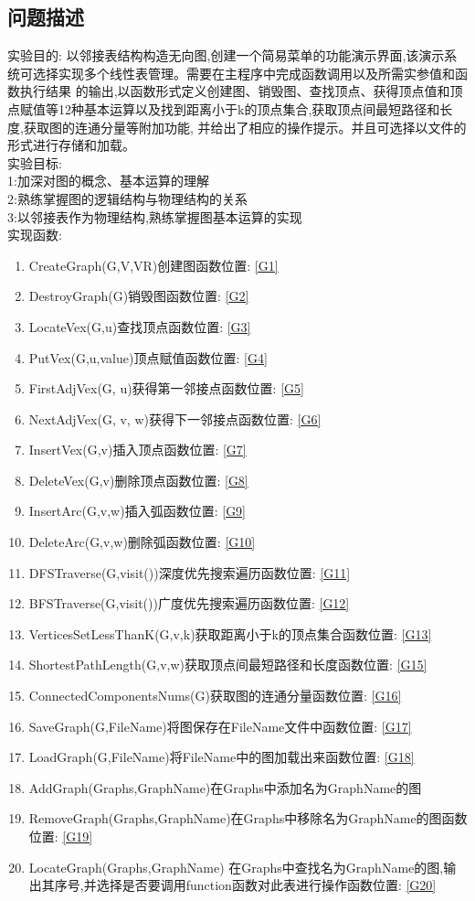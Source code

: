 \documentclass[supercite]{HustGraduPaper}
\theoremstyle{definition}
\begin{document}
\subsection{问题描述}
实验目的:
以邻接表结构构造无向图,创建一个简易菜单的功能演示界面,该演示系统可选择实现多个线性表管理。需要在主程序中完成函数调用以及所需实参值和函数执行结果
的输出,以函数形式定义创建图、销毁图、查找顶点、获得顶点值和顶点赋值等12种基本运算以及找到距离小于k的顶点集合,获取顶点间最短路径和长度,获取图的连通分量等附加功能,
并给出了相应的操作提示。并且可选择以文件的形式进行存储和加载。\\
实验目标:\\
1:\quad 加深对图的概念、基本运算的理解\\
2:\quad 熟练掌握图的逻辑结构与物理结构的关系\\
3:\quad 以邻接表作为物理结构,熟练掌握图基本运算的实现\\
实现函数:
\begin{enumerate}[label =\color{red} (\arabic*)]
	\item CreateGraph(G,V,VR)创建图\quad 函数位置: \ref{G1}
	\item DestroyGraph(G)销毁图\quad 函数位置: \ref{G2}
	\item LocateVex(G,u)查找顶点\quad 函数位置: \ref{G3}
	\item PutVex(G,u,value)顶点赋值\quad 函数位置: \ref{G4}
	\item FirstAdjVex(G, u)获得第一邻接点\quad 函数位置: \ref{G5}
	\item NextAdjVex(G, v, w)获得下一邻接点\quad 函数位置: \ref{G6}
	\item InsertVex(G,v)插入顶点\quad 函数位置: \ref{G7}
	\item DeleteVex(G,v)删除顶点\quad 函数位置: \ref{G8}
	\item InsertArc(G,v,w)插入弧\quad 函数位置: \ref{G9}
	\item DeleteArc(G,v,w)删除弧\quad 函数位置: \ref{G10}
	\item DFSTraverse(G,visit())深度优先搜索遍历\quad 函数位置: \ref{G11}
	\item BFSTraverse(G,visit())广度优先搜索遍历\quad 函数位置: \ref{G12}
	\item VerticesSetLessThanK(G,v,k)获取距离小于k的顶点集合\quad 函数位置: \ref{G13}
	\item ShortestPathLength(G,v,w)获取顶点间最短路径和长度\quad 函数位置: \ref{G15}
	\item ConnectedComponentsNums(G)获取图的连通分量\quad 函数位置: \ref{G16}
	\item SaveGraph(G,FileName)将图保存在FileName文件中\quad 函数位置: \ref{G17}
	\item LoadGraph(G,FileName)将FileName中的图加载出来\quad 函数位置: \ref{G18}
	\item AddGraph(Graphs,GraphName)在Graphs中添加名为GraphName的图
	\item RemoveGraph(Graphs,GraphName)在Graphs中移除名为GraphName的图\quad 函数位置: \ref{G19}
	\item LocateGraph(Graphs,GraphName) 在Graphs中查找名为GraphName的图,输出其序号,并选择是否要调用function函数对此表进行操作\quad 函数位置: \ref{G20}
\end{enumerate}
\end{document}
